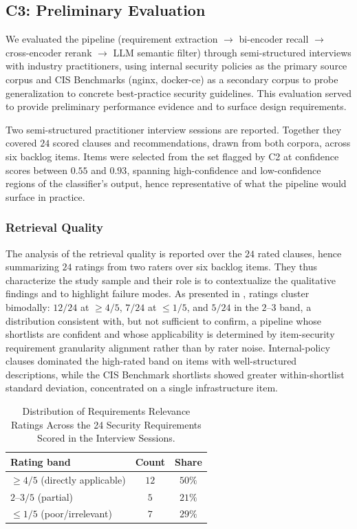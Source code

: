 \subsection*{C3: Preliminary Evaluation}

We evaluated the pipeline (requirement extraction $\to$ bi-encoder recall $\to$ cross-encoder rerank $\to$ LLM semantic filter) through semi-structured interviews with industry practitioners, using internal security policies as the primary source corpus and CIS Benchmarks (nginx, docker-ce) as a secondary corpus to probe generalization to concrete best-practice security guidelines.
This evaluation served to provide preliminary performance evidence and to surface design requirements.

Two semi-structured practitioner interview sessions are reported. Together they covered $24$ scored clauses and recommendations, drawn from both corpora, across six backlog items.
Items were selected from the set flagged by C2 at confidence scores between $0.55$ and $0.93$, spanning high-confidence and low-confidence regions of the classifier's output, hence representative of what the pipeline would surface in practice.


\subsubsection*{Retrieval Quality}\label{sec:results-c3-retrieval}

The analysis of the retrieval quality is reported over the $24$ rated clauses, hence summarizing $24$ ratings from two raters over six backlog items.
They thus characterize the study sample and their role is to contextualize the qualitative findings and to highlight failure modes.
As presented in , ratings cluster bimodally: $12/24$ at $\geq 4/5$, $7/24$ at $\leq 1/5$, and $5/24$ in the $2$--$3$ band, a distribution consistent with, but not sufficient to confirm, a pipeline whose shortlists are confident and whose applicability is determined by item-security requirement granularity alignment rather than by rater noise.
Internal-policy clauses dominated the high-rated band on items with well-structured descriptions, while the CIS Benchmark shortlists showed greater within-shortlist standard deviation, concentrated on a single infrastructure item.

\begin{table}[h]
    \centering
    \small
    \caption{Distribution of Requirements Relevance Ratings Across the 24 Security Requirements Scored in the Interview Sessions.}
    \label{tab:c3-rating-distribution}
    \begin{tabular}{lcc}
        \hline
        Rating band & Count & Share \\
        \hline
        $\geq 4/5$ (directly applicable) & $12$ & $50\%$ \\
        $2$--$3/5$ (partial)             & $5$  & $21\%$ \\
        $\leq 1/5$ (poor/irrelevant)     & $7$  & $29\%$ \\
        \hline
    \end{tabular}
\end{table}

